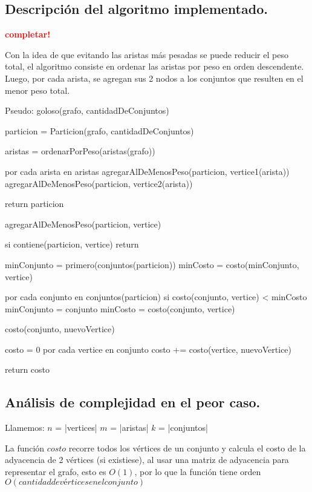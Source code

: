 \subsection{Descripción del algoritmo implementado.}
\vspace*{0.3cm}

\textcolor{red}{\textbf{completar!}}

Con la idea de que evitando las aristas más pesadas se puede reducir el peso
total, el algoritmo consiste en ordenar las aristas por peso en orden
descendente. Luego, por cada arista, se agregan sus 2 nodos a los conjuntos que
resulten en el menor peso total.

Pseudo:
goloso(grafo, cantidadDeConjuntos) {
	particion = Particion(grafo, cantidadDeConjuntos)

	aristas = ordenarPorPeso(aristas(grafo))

	por cada arista en aristas {
		agregarAlDeMenosPeso(particion, vertice1(arista))
		agregarAlDeMenosPeso(particion, vertice2(arista))
	}

	return particion
}

agregarAlDeMenosPeso(particion, vertice) {
	si contiene(particion, vertice)
		return

	minConjunto = primero(conjuntos(particion))
	minCosto = costo(minConjunto, vertice)

	por cada conjunto en conjuntos(particion) {
		si costo(conjunto, vertice) < minCosto {
			minConjunto = conjunto
			minCosto = costo(conjunto, vertice)
		}
	}
}

costo(conjunto, nuevoVertice) {
	costo = 0
	por cada vertice en conjunto {
		costo += costo(vertice, nuevoVertice)
	}

	return costo
}


\newpage
\subsection{Análisis de complejidad en el peor caso.}
\vspace*{0.3cm}

Llamemos:
$n$ = |vertices|
$m$ = |aristas|
$k$ = |conjuntos|

\vspace*{0.3cm}

La función $costo$ recorre todos los vértices de un conjunto y calcula el
costo de la adyacencia de 2 vértices (si existiese), al usar una matriz de
adyacencia para representar el grafo, esto es $O(1)$, por lo que la función
tiene orden $O(cantidad de vértices en el conjunto)$

